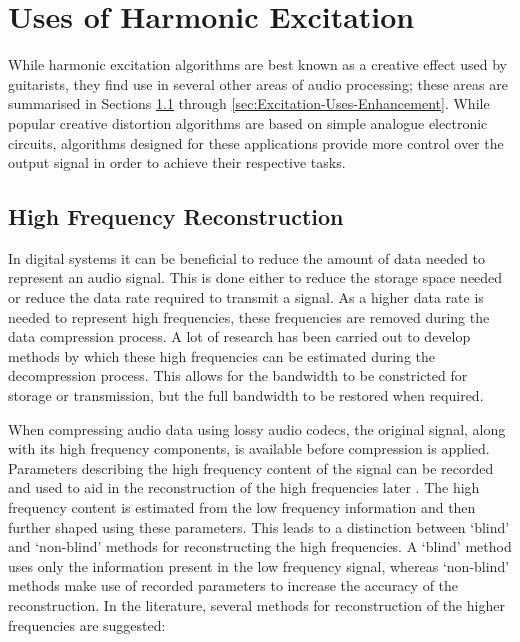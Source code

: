 \section{Uses of Harmonic Excitation}
\label{sec:Excitation-Uses}
	While harmonic excitation algorithms are best known as a creative effect used by guitarists, they find use in
	several other areas of audio processing; these areas are summarised in Sections
	\ref{sec:Excitation-Uses-Reconstruction} through \ref{sec:Excitation-Uses-Enhancement}. While popular creative
	distortion algorithms are based on simple analogue electronic circuits, algorithms designed for these applications
	provide more control over the output signal in order to achieve their respective tasks.

	\subsection{High Frequency Reconstruction}
	\label{sec:Excitation-Uses-Reconstruction}
		In digital systems it can be beneficial to reduce the amount of data needed to represent an audio signal.
		This is done either to reduce the storage space needed or reduce the data rate required to transmit a
		signal. As a higher data rate is needed to represent high frequencies, these frequencies are removed during
		the data compression process. A lot of research has been carried out to develop methods by which these high
		frequencies can be estimated during the decompression process. This allows for the bandwidth to be
		constricted for storage or transmission, but the full bandwidth to be restored when required.

		When compressing audio data using lossy audio codecs, the original signal, along with its high frequency
		components, is available before compression is applied. Parameters describing the high frequency content of
		the signal can be recorded and used to aid in the reconstruction of the high frequencies later
		\citep{dietz2002spectral, friedrich2007spectral}. The high frequency content is estimated from the low
		frequency information and then further shaped using these parameters. This leads to a distinction between
		`blind' and `non-blind' methods for reconstructing the high frequencies. A `blind' method uses only the
		information present in the low frequency signal, whereas `non-blind' methods make use of recorded
		parameters to increase the accuracy of the reconstruction. In the literature, several methods for
		reconstruction of the higher frequencies are suggested:

